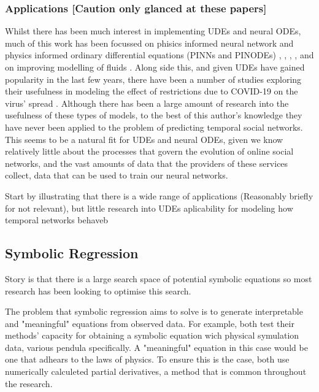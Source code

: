 \documentclass[12pt]{amsart}
\begin{document}
    \subsubsection{Applications [Caution only glanced at these papers]}
        Whilst there has been much interest in implementing UDEs and neural ODEs, much of this work has been focussed on phisics informed neural network and physics informed ordinary differential equations (PINNs and PINODEs) \cite{karniadakis2021physics}, \cite{GAO2021110079}, \cite{krishnapriyan2021characterizing}, \cite{roehrl2020modeling}, and on improving modelling of fluids \cite{mahmoudabadbozchelou2021data} \cite{nguyen2022physics}. Along side this, and given UDEs have gained popularity in the last few years, there have been a number of studies exploring their usefulness in modeling the effect of restrictions due to COVID-19 on the virus' spread \cite{Dandekar2020.04.03.20052084}. Although there has been a large amount of research into the usefulness of these types of models, to the best of this author's knowledge they have never been applied to the problem of predicting temporal social networks. This seems to be a natural fit for UDEs and neural ODEs, given we know relatively little about the processes that govern the evolution of online social networks, and the vast amounts of data that the providers of these services collect, data that can be used to train our neural networks.

        
        
    
     Start by illustrating that there is a wide range of applications (Reasonably briefly for not relevant), but little research into UDEs aplicability for modeling how temporal networks behaveb

\subsection{Symbolic Regression}
    Story is that there is a large search space of potential symbolic equations so most research has been looking to optimise this search. 

    The problem that symbolic regression aims to solve is to generate interpretable and "meaningful" equations from observed data. For example, both \cite{schmidt2009distilling,bongard2007automated} test their methods' capacity for obtaining a symbolic equation wich physical symulation data, various pendula specifically. A "meaningful" equation in this case would be one that adhears to the laws of physics. To ensure this is the case, both use numerically calculeted partial derivatives, a method that is common throughout the research.
\end{document}
